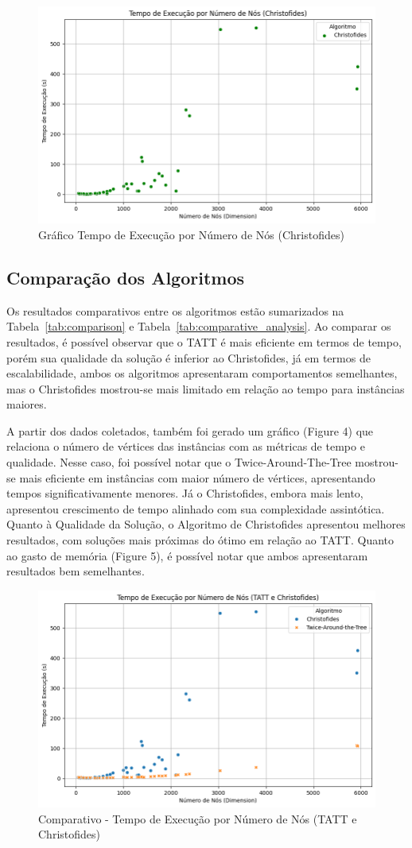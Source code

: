 \documentclass[12pt]{article}
\begin{document}
\begin{figure}[ht]
\centering
\includegraphics[width=.7\textwidth]{Figure2.png}
\caption{Gráfico Tempo de Execução por Número de Nós (Christofides)}
\label{fig:exampleFig3}
\end{figure}

\subsection{Comparação dos Algoritmos}
Os resultados comparativos entre os algoritmos estão sumarizados na Tabela~\ref{tab:comparison} e Tabela~\ref{tab:comparative_analysis}. Ao comparar os resultados, é possível observar que o TATT é mais eficiente em termos de tempo, porém sua qualidade da solução é inferior ao Christofides, já em termos de escalabilidade, ambos os algoritmos apresentaram comportamentos semelhantes, mas o Christofides mostrou-se mais limitado em relação ao tempo para instâncias maiores.

A partir dos dados coletados, também foi gerado um gráfico (Figure 4) que relaciona o número de vértices das instâncias com as métricas de tempo e qualidade. Nesse caso, foi possível notar que o Twice-Around-The-Tree mostrou-se mais eficiente em instâncias com maior número de vértices, apresentando tempos significativamente menores.
Já o Christofides, embora mais lento, apresentou crescimento de tempo alinhado com sua complexidade assintótica. Quanto à Qualidade da Solução, o Algoritmo de Christofides apresentou melhores resultados, com soluções mais próximas do ótimo em relação ao TATT. Quanto ao gasto de memória (Figure 5), é possível notar que ambos apresentaram resultados bem semelhantes.

\begin{figure}[ht]
\centering
\includegraphics[width=.7\textwidth]{Figure3.png}
\caption{Comparativo - Tempo de Execução por Número de Nós (TATT e Christofides)}
\label{fig:exampleFig4}
\end{figure}
\end{document}
